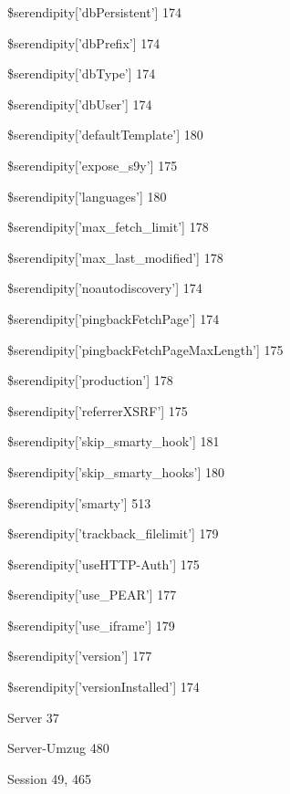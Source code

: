 \documentclass{book}
\renewcommand\subitem{\par}
\begin{document}
\begin{multicols}{2}
\begin{osp-index}
    \subitem \$serendipity['dbPersistent']\hspace{1mm} 174
    \subitem \$serendipity['dbPrefix']\hspace{1mm} 174
    \subitem \$serendipity['dbType']\hspace{1mm} 174
    \subitem \$serendipity['dbUser']\hspace{1mm} 174
    \subitem \$serendipity['defaultTemplate']\hspace{1mm} 180
    \subitem \$serendipity['expose\_s9y']\hspace{1mm} 175
    \subitem \$serendipity['languages']\hspace{1mm} 180
    \subitem \$serendipity['max\_fetch\_limit']\hspace{1mm} 178
    \subitem \$serendipity['max\_last\_modified']\hspace{1mm} 178
    \subitem \$serendipity['noautodiscovery']\hspace{1mm} 174
    \subitem \$serendipity['pingbackFetchPage']\hspace{1mm} 174
    \subitem \$serendipity['pingbackFetchPageMaxLength']\hspace{1mm} 
		175
    \subitem \$serendipity['production']\hspace{1mm} 178
    \subitem \$serendipity['referrerXSRF']\hspace{1mm} 175
    \subitem \$serendipity['skip\_smarty\_hook']\hspace{1mm} 181
    \subitem \$serendipity['skip\_smarty\_hooks']\hspace{1mm} 180
    \subitem \$serendipity['smarty']\hspace{1mm} 513
    \subitem \$serendipity['trackback\_filelimit']\hspace{1mm} 179
    \subitem \$serendipity['useHTTP-Auth']\hspace{1mm} 175
    \subitem \$serendipity['use\_PEAR']\hspace{1mm} 177
    \subitem \$serendipity['use\_iframe']\hspace{1mm} 179
    \subitem \$serendipity['version']\hspace{1mm} 177
    \subitem \$serendipity['versionInstalled']\hspace{1mm} 174
  \item Server\hspace{1mm} 37
  \item Server-Umzug\hspace{1mm} 480
  \item Session\hspace{1mm} 49, 465

\end{osp-index}
\end{multicols}
\end{document}
